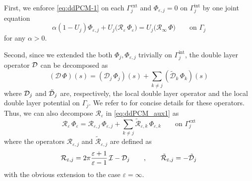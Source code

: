 First, we enforce \eqref{eq:ddPCM-1} on each $\Gamma_j^\text{ext}$ and $\Phi_{\varepsilon,j}=0$ on $\Gamma_j^\text{int}$ by one joint equation
\begin{equation}
	\label{eq:ddPCM_aux1}
	\alpha(1 - U_j)\Phi_{\varepsilon,j} + U_j \bigg( {\mathcal{R}}_{\varepsilon} \, \Phi_{\varepsilon} \bigg) = U_j \bigg( {\mathcal{R}}_{\infty} \, \Phi \bigg)\qquad \text{on }\Gamma_j
\end{equation}
for any $\alpha>0$.

Second, since we extended the both $\Phi_j , \Phi_{\varepsilon,j}$ trivially on $\Gamma_j^\text{int}$, the double layer operator $\mathcal{D}$ can be decomposed as
\[
(\mathcal{D} \, \Phi ) (s) = ( \mathcal{D}_j \, \Phi_j )(s) + \sum_{k \ne j} (\tilde{\mathcal{D}}_k \, \Phi_k )(s) 
\]
where $\mathcal{D}_j$ and $\tilde{\mathcal{D}}_j$ are, respectively, the local double layer operator and the local double layer potential on $\Gamma_j$. 
We refer to\cite{ddPCM} for concise details for these operators.
Thus, we can also decompose ${\mathcal{R}}_{\varepsilon}$ in \eqref{eq:ddPCM_aux1} as
\begin{equation}\label{eq:PCM_aux2}
{\mathcal{R}}_{\varepsilon} \, \Phi_{\varepsilon}
=
{\mathcal{R}}_{\varepsilon,j} \, \Phi_{\varepsilon,j} + \sum_{k \ne j} \tilde{\mathcal{R}}_{\varepsilon,k} \, \Phi_{\varepsilon,k} 
\qquad \text{on }\Gamma_j^\text{ext}
\end{equation}
where the operators ${\mathcal{R}}_{\varepsilon,j}$ and $\tilde{\mathcal{R}}_{\varepsilon,j}$ are defined as
\[
{\mathcal{R}}_{\varepsilon,j} = 2 \pi \frac{\varepsilon + 1}{\varepsilon - 1} \, \mathcal{I} - {\mathcal{D}}_j  \qquad, \qquad
\tilde{\mathcal{R}}_{\varepsilon,j} =  - \tilde{\mathcal{D}}_j
\]
with the obvious extension to the case $\varepsilon = \infty$. 
%


